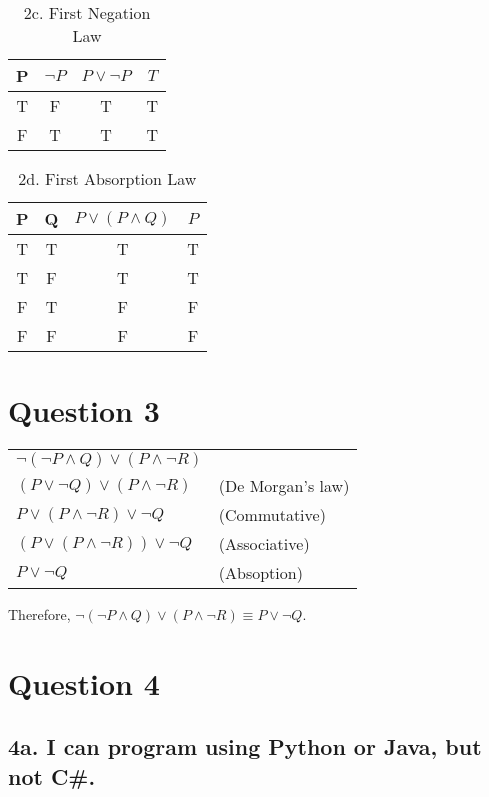 \documentclass{article}
\begin{document}
\begin{table}[h]
\centering
\caption{2c. First Negation Law}
\begin{tabular}{cc|cc}
P & $\neg P$& $P \lor \neg P$ & $T$ \\ \hline
T & F & T          & T                                    \\
F & T & T          & T                                    
\end{tabular}
\end{table}

\begin{table}[h]
\centering
\caption{2d. First Absorption Law}
\begin{tabular}{cc|cc}
P & Q & $P \lor (P \land Q)$ & $P$ \\ \hline
T & T & T          & T                                    \\
T & F & T          & T                                    \\
F & T & F          & F                                    \\
F & F & F          & F                                   
\end{tabular}
\end{table}
\section*{Question 3}
\begin{tabular}{ll}
$\neg (\neg P \land Q) \lor (P \land \neg R)$ & \\
$(P \lor \neg Q) \lor (P \land \neg R)$ & (De Morgan's law) \\
$P \lor (P \land \neg R) \lor  \neg Q$ & (Commutative) \\
$(P \lor (P \land \neg R)) \lor  \neg Q$ & (Associative) \\
$P \lor \neg Q$ & (Absoption) \\
\end{tabular}

Therefore, $\neg (\neg P \land Q) \lor (P \land \neg R) \equiv P \lor \neg Q$. 

\section*{Question 4}
\subsection*{4a. I can program using Python or Java, but not C\#.}
\end{document}

